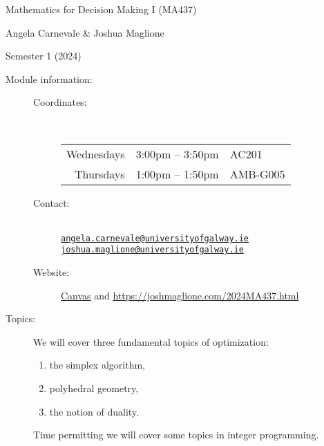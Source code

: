 \documentclass[a4paper, 12pt]{article}
\begin{document}
\pagestyle{empty}

\begin{center}
{\Large Mathematics for Decision Making I (MA437)} 

\vspace{0.25cm}

{\large Angela Carnevale \& Joshua Maglione}

\vspace{0.25cm}

Semester 1 (2024)
\end{center}

\vspace{0.5cm}

\begin{description}
    \item[Module information:] \hfill
    \begin{description}
      \item[Coordinates:] \hfill \\ [0.5em]
        \begin{tabular}{rcl}
          Wednesdays & 3:00pm -- 3:50pm & AC201 \\ Thursdays & 1:00pm -- 1:50pm & AMB-G005
        \end{tabular}
      \item[Contact:] \hfill \\ \href{mailto:angela.carnevale@universityofgalway.ie}{\texttt{angela.carnevale@universityofgalway.ie}} \\ \href{mailto:joshua.maglione@universityofgalway.ie}{\texttt{joshua.maglione@universityofgalway.ie}}
      \item[Website:] \href{https://universityofgalway.instructure.com/}{\textsf{Canvas}} and \url{https://joshmaglione.com/2024MA437.html} 
    \end{description} 
    \vspace{1cm}
    \item[Topics:] We will cover three fundamental topics of optimization:
    \begin{enumerate} 
      \item the simplex algorithm,
      \item polyhedral geometry,
      \item the notion of duality. 
    \end{enumerate}
    Time permitting we will cover some topics in integer programming.
    \vspace{1cm}

\end{description}
\end{document}
